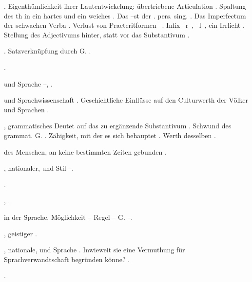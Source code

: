 \begin{register}
.  Eigenthümlichkeit ihrer Lautentwickelung: übertriebene Articulation \pageref{sp.183}.  Spaltung des th in ein hartes und ein weiches \pageref{sp.190}. Das –st der \pageref{sp.2}. pers. sing. \pageref{sp.203}. Das Imperfectum der schwachen Verba \pageref{sp.241}. Verlust von Praeteritformen \pageref{sp.253}–\pageref{sp.254}. Infix –r–, –l–, ein Irrlicht \pageref{sp.292}. Stellung des Adjectivums hinter, statt vor das Substantivum \pageref{sp.457}.

. Satzverknüpfung durch G. \pageref{sp.466}.

 \pageref{sp.325}.

 und Sprache \pageref{sp.309}–\pageref{sp.310}, \pageref{sp.311}.


 und Sprachwissenschaft \pageref{sp.13}. Geschichtliche Einflüsse auf den Culturwerth der Völker und Sprachen \pageref{sp.395}.

, grammatisches \pageref{sp.160} Deutet auf das zu ergänzende Substantivum \pageref{sp.237}. Schwund des grammat. G. \pageref{sp.254}.  Zähigkeit, mit der es sich behauptet \pageref{sp.364}. Werth desselben \pageref{sp.391}.

 des Menschen, an keine bestimmten Zeiten gebunden \pageref{sp.306}.

, nationaler, und Stil \pageref{sp.105}–\pageref{sp.106}.

 \pageref{sp.235}.

 \pageref{sp.309}, \pageref{sp.472}.


 in der Sprache. Möglichkeit – Regel – G. \pageref{sp.385}–\pageref{sp.387}.

, geistiger \pageref{sp.325}.

, nationale, und Sprache \pageref{sp.17}. Inwieweit sie eine Vermuthung für Sprachverwandtschaft begründen könne? \pageref{sp.148}.

 \pageref{sp.473}.



\end{register}
